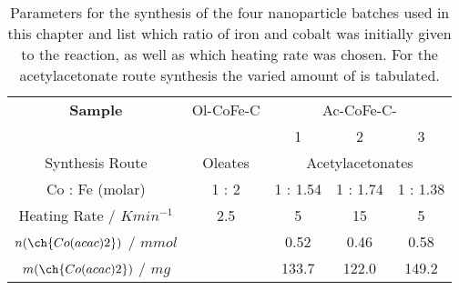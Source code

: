 \documentclass[\main/dresen_thesis.tex]{subfiles}
\begin{document}
    \begin{table}[htbp]
      \centering
      \caption{\label{tab:monolayers:synthesis:nanoparticles}Parameters for the synthesis of the four nanoparticle batches used in this chapter and list which ratio of iron and cobalt was initially given to the reaction, as well as which heating rate was chosen. For the acetylacetonate route synthesis the varied amount of  is tabulated.}
      \begin{tabular}{ c || c || c | c | c }
        \textbf{Sample} & Ol-CoFe-C & \multicolumn{3}{c}{Ac-CoFe-C-}\\
                        &           & 1 & 2 & 3 \\
        \hline
        \rule{0pt}{2ex} Synthesis Route                       & Oleates & \multicolumn{3}{c}{Acetylacetonates}\\
        \hline
        \rule{0pt}{2ex} Co : Fe (molar)                       & 1 : 2   & 1 : 1.54 & 1 : 1.74 & 1 : 1.38 \\
        \hline
        \rule{0pt}{2ex} Heating Rate / $\unit{K min^{-1}}$    & 2.5     & 5        & 15       & 5 \\
        \hline
        \rule{0pt}{2ex} $n(\ch{Co(acac)2})$ / $\unit{mmol}$   &         & 0.52     & 0.46      & 0.58  \\
        \rule{0pt}{2ex} $m(\ch{Co(acac)2})$ / $\unit{mg}$     &         & 133.7    & 122.0     & 149.2 \\
        \hline
      \end{tabular}
    \end{table}
\end{document}
